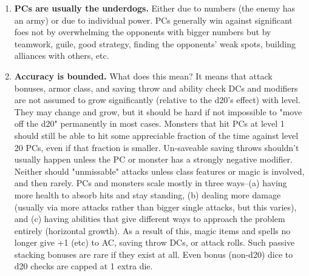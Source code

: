 \begin{enumerate}
\item \textbf{PCs are usually the underdogs.} Either due to numbers (the enemy has an army) or due to individual power. PCs generally win against significant foes not by overwhelming the opponents with bigger numbers but by teamwork, guile, good strategy, finding the opponents' weak spots, building alliances with others, etc.
\item \textbf{Accuracy is bounded.} What does this mean? It means that attack bonuses, armor class, and saving throw and ability check DCs and modifiers are not assumed to grow significantly (relative to the d20's effect) with level. They may change and grow, but it should be hard if not impossible to "move off the d20" permanently in most cases. Monsters that hit PCs at level 1 should still be able to hit some appreciable fraction of the time against level 20 PCs, even if that fraction is smaller. Un-saveable saving throws shouldn't usually happen unless the PC or monster has a strongly negative modifier. Neither should "unmissable" attacks unless class features or magic is involved, and then rarely. PCs and monsters scale mostly in three ways--(a) having more health to absorb hits and stay standing, (b) dealing more damage (usually via more attacks rather than bigger single attacks, but this varies), and (c) having abilities that give different ways to approach the problem entirely (horizontal growth). As a result of this, magic items and spells no longer give +1 (etc) to AC, saving throw DCs, or attack rolls. Such passive stacking bonuses are rare if they exist at all. Even bonus (non-d20) dice to d20 checks are capped at 1 extra die.
\end{enumerate}

